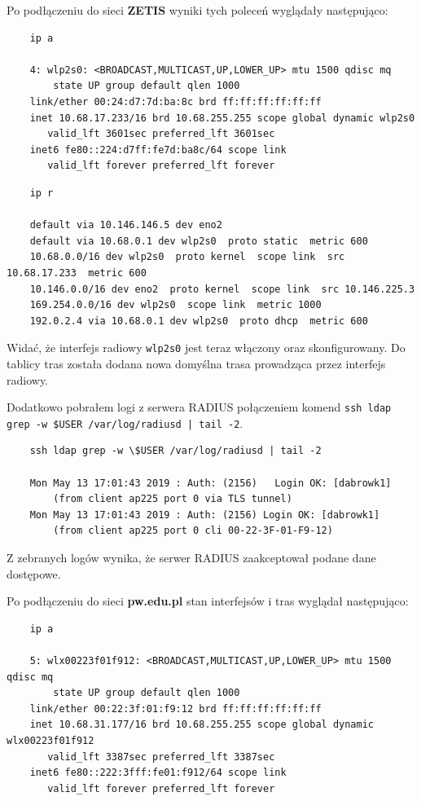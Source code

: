 \documentclass{mwart} %
\begin{document}
Po podłączeniu do sieci \textbf{ZETIS} wyniki tych poleceń wyglądały następująco:
\begin{verbatim}
    ip a

    4: wlp2s0: <BROADCAST,MULTICAST,UP,LOWER_UP> mtu 1500 qdisc mq
        state UP group default qlen 1000
    link/ether 00:24:d7:7d:ba:8c brd ff:ff:ff:ff:ff:ff
    inet 10.68.17.233/16 brd 10.68.255.255 scope global dynamic wlp2s0
       valid_lft 3601sec preferred_lft 3601sec
    inet6 fe80::224:d7ff:fe7d:ba8c/64 scope link 
       valid_lft forever preferred_lft forever
\end{verbatim}

\begin{verbatim}
    ip r 

    default via 10.146.146.5 dev eno2 
    default via 10.68.0.1 dev wlp2s0  proto static  metric 600 
    10.68.0.0/16 dev wlp2s0  proto kernel  scope link  src 10.68.17.233  metric 600 
    10.146.0.0/16 dev eno2  proto kernel  scope link  src 10.146.225.3 
    169.254.0.0/16 dev wlp2s0  scope link  metric 1000 
    192.0.2.4 via 10.68.0.1 dev wlp2s0  proto dhcp  metric 600 
\end{verbatim}

Widać, że interfejs radiowy \texttt{wlp2s0} jest teraz włączony oraz skonfigurowany.
Do tablicy tras została dodana nowa domyślna trasa prowadząca przez interfejs radiowy.
\vspace{5 mm}

Dodatkowo pobrałem logi z serwera RADIUS połączeniem komend \texttt{ssh ldap grep -w \$USER /var/log/radiusd | tail -2}.
\begin{verbatim}
    ssh ldap grep -w \$USER /var/log/radiusd | tail -2

    Mon May 13 17:01:43 2019 : Auth: (2156)   Login OK: [dabrowk1] 
        (from client ap225 port 0 via TLS tunnel)
    Mon May 13 17:01:43 2019 : Auth: (2156) Login OK: [dabrowk1]
        (from client ap225 port 0 cli 00-22-3F-01-F9-12)
\end{verbatim}
Z zebranych logów wynika, że serwer RADIUS zaakceptował podane dane dostępowe.

Po podłączeniu do sieci \textbf{pw.edu.pl} stan interfejsów i tras wyglądał następująco:

\begin{verbatim}
    ip a

    5: wlx00223f01f912: <BROADCAST,MULTICAST,UP,LOWER_UP> mtu 1500 qdisc mq
        state UP group default qlen 1000
    link/ether 00:22:3f:01:f9:12 brd ff:ff:ff:ff:ff:ff
    inet 10.68.31.177/16 brd 10.68.255.255 scope global dynamic wlx00223f01f912
       valid_lft 3387sec preferred_lft 3387sec
    inet6 fe80::222:3fff:fe01:f912/64 scope link 
       valid_lft forever preferred_lft forever
\end{verbatim}
\end{document}
